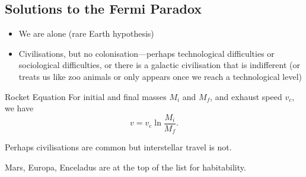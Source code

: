 \documentclass[class=article, crop=false]{standalone}
\begin{document}
  \subsection{Solutions to the Fermi Paradox}
  \begin{itemize}
    \item We are alone (rare Earth hypothesis)
    \item Civilisations, but no colonisation---perhaps technological difficulties or sociological difficulties, or there is a galactic civilisation that is indifferent (or treats us like zoo animals or only appears once we reach a technological level)
  \end{itemize}
  \begin{theorem}{Rocket Equation}
    For initial and final masses $M_i$ and $M_f$, and exhaust speed $v_c$, we have
    \[
      v = v_c\ln \frac{M_i}{M_f}.
    \]
  \end{theorem}
  Perhaps civilisations are common but interstellar travel is not. \par
  Mars, Europa, Enceladus are at the top of the list for habitability.
\end{document}
